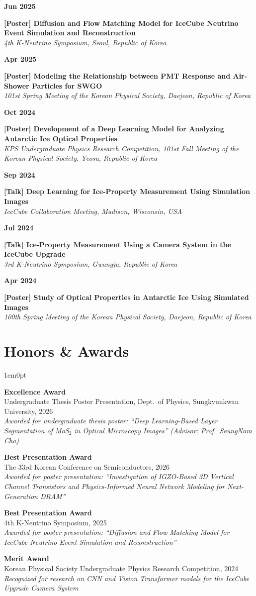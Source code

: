\documentclass[11pt, a4paper]{article}
\newcommand{\conferenceitem}[3]{%
    \noindent
    \parbox[t]{0.15\textwidth}{{\color{primary}\textbf{#1}}}%
    \hfill
    \parbox[t]{0.83\textwidth}{\textbf{#2}\\[2pt]\textit{#3}}%
    \vspace{8pt}\par
}
\newcommand{\awarditem}[3]{
    \begin{tcolorbox}[
        colback=white,
        colframe=primary,
        boxrule=0pt,
        leftrule=3pt,
        arc=0pt,
        left=5pt,
        right=5pt,
        top=4pt,
        bottom=4pt
    ]
    \textbf{#1} \\[2pt]
    #2 \\[2pt]
    {\small\textit{#3}}
    \end{tcolorbox}
    \vspace{3pt}
}
\newenvironment{secbody}{\begin{adjustwidth}{1em}{0pt}}{\end{adjustwidth}}
\begin{document}
\conferenceitem{Jun 2025}{[Poster] Diffusion and Flow Matching Model for IceCube Neutrino Event Simulation and Reconstruction}{4th K-Neutrino Symposium, Seoul, Republic of Korea}

\conferenceitem{Apr 2025}{[Poster] Modeling the Relationship between PMT Response and Air-Shower Particles for SWGO}{101st Spring Meeting of the Korean Physical Society, Daejeon, Republic of Korea}

\conferenceitem{Oct 2024}{[Poster] Development of a Deep Learning Model for Analyzing Antarctic Ice Optical Properties}{KPS Undergraduate Physics Research Competition, 101st Fall Meeting of the Korean Physical Society, Yeosu, Republic of Korea}

\conferenceitem{Sep 2024}{[Talk] Deep Learning for Ice-Property Measurement Using Simulation Images}{IceCube Collaboration Meeting, Madison, Wisconsin, USA}

\conferenceitem{Jul 2024}{[Talk] Ice-Property Measurement Using a Camera System in the IceCube Upgrade}{3rd K-Neutrino Symposium, Gwangju, Republic of Korea}

\conferenceitem{Apr 2024}{[Poster] Study of Optical Properties in Antarctic Ice Using Simulated Images}{100th Spring Meeting of the Korean Physical Society, Daejeon, Republic of Korea}

\newpage
\section{Honors \& Awards}
\begin{secbody}
\awarditem{Excellence Award}{Undergraduate Thesis Poster Presentation, Dept.\ of Physics, Sungkyunkwan University, 2026}{Awarded for undergraduate thesis poster: ``Deep Learning-Based Layer Segmentation of MoS$_2$ in Optical Microscopy Images'' (Advisor: Prof.\ SeungNam Cha)}

\awarditem{Best Presentation Award}{The 33rd Korean Conference on Semiconductors, 2026}{Awarded for poster presentation: ``Investigation of IGZO-Based 3D Vertical Channel Transistors and
Physics-Informed Neural Network Modeling for Next-Generation DRAM''}

\awarditem{Best Presentation Award}{4th K-Neutrino Symposium, 2025}{Awarded for poster presentation: ``Diffusion and Flow Matching Model for IceCube Neutrino Event Simulation and Reconstruction''}

\awarditem{Merit Award}{Korean Physical Society Undergraduate Physics Research Competition, 2024}{Recognized for research on CNN and Vision Transformer models for the IceCube Upgrade Camera System}
\end{secbody}
\end{document}
